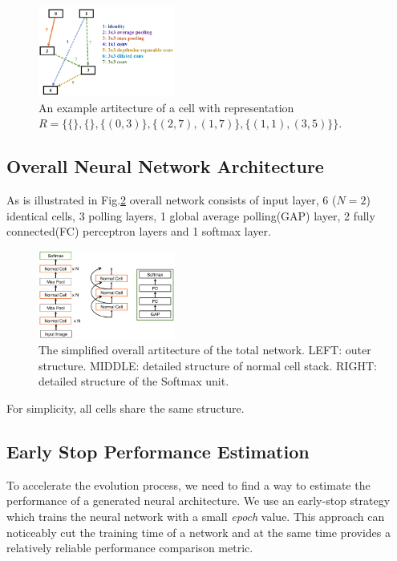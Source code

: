 \documentclass[conference]{IEEEtran}
\begin{document}
  \begin{figure}[H]
 	\centering
 	\includegraphics[width=0.4\textwidth]{figures/cellStruct.png}
   \caption{An example artitecture of a cell with representation $R=\{\{\},\{\},\{(0,3)\},\{(2,7),(1,7)\},\{(1,1),(3,5)\}\}$.}\label{fig:digit}
   \label{f_artc}
  \end{figure}

  \subsection{Overall Neural Network Architecture}
  As is illustrated in Fig.\ref{total_artc} overall network consists of input layer, 6 ($N = 2$) identical cells, 3 polling layers, 1 global average polling(GAP) layer, 2 fully connected(FC) perceptron layers and 1 softmax layer. 

  \begin{figure}[H]
 	\centering
 	\includegraphics[width=0.4\textwidth]{figures/overallStruct.png}
   \caption{The simplified overall artitecture of the total network. LEFT: outer structure. MIDDLE: detailed structure of normal cell stack. RIGHT: detailed structure of the Softmax unit.}\label{fig:digit}
   \label{total_artc}
  \end{figure}

  For simplicity, all cells share the same structure. 

  \subsection{Early Stop Performance Estimation}

  To accelerate the evolution process, we need to find a way to estimate the performance of a generated neural architecture. We use an early-stop strategy which trains the neural network with a small \emph{epoch} value. This approach can noticeably cut the training time of a network and at the same time provides a relatively reliable performance comparison metric.
\end{document}
